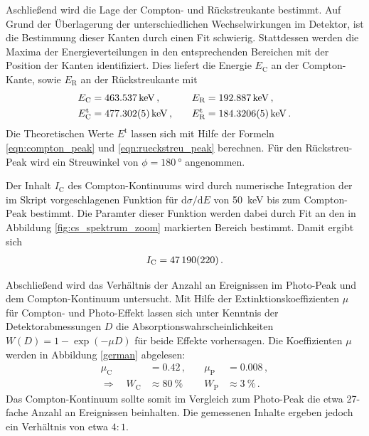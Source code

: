 Aschließend wird die Lage der Compton- und Rückstreukante bestimmt.
Auf Grund der Überlagerung der unterschiedlichen Wechselwirkungen im Detektor, ist die Bestimmung dieser Kanten durch einen Fit schwierig.
Stattdessen werden die Maxima der Energieverteilungen in den entsprechenden Bereichen mit der Position der Kanten identifiziert.
Dies liefert die Energie $E_\text{C}$ an der Compton-Kante, sowie $E_\text{R}$ an der Rückstreukante mit
\begin{align*}
    E_\text{C} &= \SI{463.537}{keV}\,, &\quad E_\text{R} &= \SI{192.887}{keV} \,,\\
    E_\text{C}^\text{t} &= \SI{477.302+-0.005}{keV}\,, &\quad E_\text{R}^\text{t} &= \SI{184.3206+-0.0005}{keV} \,.\\
\end{align*}
Die Theoretischen Werte $E^\text{t}$ lassen sich mit Hilfe der Formeln \eqref{eqn:compton_peak} und \eqref{eqn:rueckstreu_peak} berechnen. Für den Rückstreu-Peak wird ein Streuwinkel von $\phi = \SI{180}{\degree}$ angenommen.

Der Inhalt $I_\text{C}$ des Compton-Kontinuums wird durch numerische Integration der im Skript vorgeschlagenen Funktion für $\text{d}\sigma/\text{d}E$ von \SI{50}{keV} bis zum Compton-Peak bestimmt.
Die Paramter dieser Funktion werden dabei durch Fit an den in Abbildung \ref{fig:cs_spektrum_zoom} markierten Bereich bestimmt. Damit ergibt sich
\begin{align*}
    I_\text{C} = \num{47190+-220}\,.
\end{align*}

Abschließend wird das Verhältnis der Anzahl an Ereignissen im Photo-Peak und dem Compton-Kontinuum untersucht.
Mit Hilfe der Extinktionskoeffizienten $\mu$ für Compton- und Photo-Effekt lassen sich unter Kenntnis der Detektorabmessungen $D$ die Absorptionswahrscheinlichkeiten $W(D)=1-\exp(-\mu D)$ für beide Effekte vorhersagen. Die Koeffizienten $\mu$ werden in Abbildung \ref{german} abgelesen:
\begin{align*}
    \mu_\text{C} &= \num{0.42}\,, &\quad \mu_\text{P} &= \num{0.008}\,,\\
    \Rightarrow \quad W_\text{C} &\approx \SI{80}{\percent} &\quad W_\text{P} &\approx \SI{3}{\percent} \,.
\end{align*}
Das Compton-Kontinuum sollte somit im Vergleich zum Photo-Peak die etwa \num{27}-fache Anzahl an Ereignissen beinhalten.
Die gemessenen Inhalte ergeben jedoch ein Verhältnis von etwa $4:1$.

